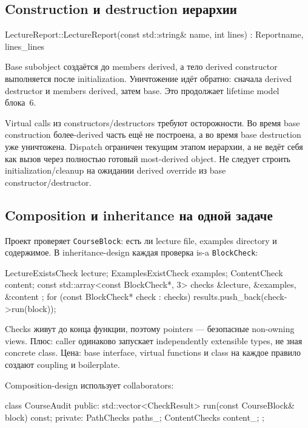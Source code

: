 \subsection{Construction и destruction иерархии}

\begin{cppcode}
LectureReport::LectureReport(const std::string& name, int lines)
    : Report{name}, lines_{lines} {}
\end{cppcode}

Base subobject создаётся до members derived, а тело derived constructor
выполняется после initialization. Уничтожение идёт обратно: сначала derived
destructor и members derived, затем base. Это продолжает lifetime model
блока~6.

Virtual calls из constructors/destructors требуют осторожности. Во время base
construction более-derived часть ещё не построена, а во время base
destruction уже уничтожена. Dispatch ограничен текущим этапом иерархии, а не
ведёт себя как вызов через полностью готовый most-derived object. Не следует
строить initialization/cleanup на ожидании derived override из base
constructor/destructor.

\subsection{Composition и inheritance на одной задаче}

Проект проверяет \texttt{CourseBlock}: есть ли lecture file, examples
directory и содержимое. В inheritance-design каждая проверка is-a
\texttt{BlockCheck}:

\begin{cppcode}
LectureExistsCheck lecture;
ExamplesExistCheck examples;
ContentCheck content;
const std::array<const BlockCheck*, 3> checks{
    &lecture, &examples, &content
};
for (const BlockCheck* check : checks) {
    results.push_back(check->run(block));
}
\end{cppcode}

Checks живут до конца функции, поэтому pointers --- безопасные non-owning
views. Плюс: caller одинаково запускает independently extensible types, не
зная concrete class. Цена: base interface, virtual functions и class на
каждое правило создают coupling и boilerplate.

Composition-design использует collaborators:

\begin{cppcode}
class CourseAudit {
public:
    std::vector<CheckResult> run(const CourseBlock& block) const;
private:
    PathChecks paths_;
    ContentChecks content_;
};
\end{cppcode}

